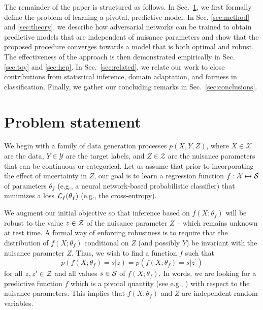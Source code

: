 \documentclass{article}
\theoremstyle{plain}
\begin{document}
The remainder of the paper is structured as follows. In Sec.~\ref{sec:problem},
we first formally define the problem of learning a pivotal, predictive model. In
Sec. \ref{sec:method} and \ref{sec:theory}, we describe how adversarial
networks can be trained to obtain predictive models that are independent of
nuisance parameters and show that the proposed procedure converges
towards a model that is both optimal and robust. The  effectiveness of the
approach is then demonstrated empirically in Sec. \ref{sec:toy} and \ref{sec:hep}.
In Sec.~\ref{sec:related}, we relate our work to
close contributions from statistical inference, domain adaptation, and fairness
in classification. Finally, we gather our concluding remarks in
Sec.~\ref{sec:conclusions}.


\section{Problem statement}
\label{sec:problem}

We begin with a family of data generation processes $p(X,Y,Z)$, where $X \in
\mathcal{X}$ are the data, $Y\in \mathcal{Y}$ are the target labels, and $Z\in
\mathcal{Z}$ are the nuisance parameters that can be continuous or categorical.
Let us assume that prior to incorporating the effect of uncertainty
in $Z$, our goal is to learn a regression function $f : \mathcal{X} \mapsto
{\cal S}$ of parameters $\theta_f$ (e.g., a neural network-based probabilistic
classifier) that minimizes a loss ${\cal L}_f(\theta_f)$ (e.g., the
cross-entropy).

We augment our initial objective so that inference based on $f(X ; \theta_f)$ will be
robust to the value $z \in {\cal Z}$ of the nuisance parameter $Z$  -- which remains unknown at
test time. A formal way of enforcing robustness is to require that the distribution of
$f(X ; \theta_f)$ conditional on $Z$ (and possibly $Y$) be invariant with
 the nuisance parameter $Z$. Thus, we wish to find a function $f$ such that
\begin{equation}\label{eqn:criterion}
    p(f(X ; \theta_f) = s | z ) = p(f(X ; \theta_f) = s | z^\prime )
\end{equation}
for all $z,z^\prime \in  {\cal Z}$ and all values $s \in {\cal S}$ of $f(X ; \theta_f)$.
In words, we are looking for a predictive function $f$
which is a pivotal quantity (see e.g., \citep{degroot1986probability}) with respect to the
nuisance parameters. This implies that  $f(X; \theta_f)$ and $Z$ are independent random variables.
\end{document}
